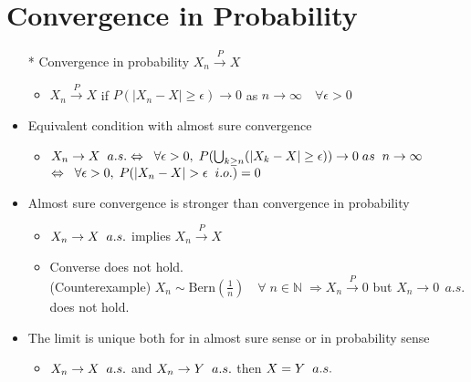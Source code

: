 \documentclass[12pt, A4]{article}
\begin{document}
\section{Convergence in Probability}
\begin{itemize}
	\item[*] Convergence in probability $X_n \xrightarrow{P} X$
	\begin{itemize}
		\item $X_n \xrightarrow{P} X$ if $P(|X_n-X|\geq \epsilon)\rightarrow 0$ as $ n\rightarrow \infty \quad \forall \epsilon>0$
	\end{itemize}
	\item Equivalent condition with almost sure convergence
	\begin{itemize}
		\item $X_n \rightarrow X \hspace{0.2cm} a.s. \Leftrightarrow \hspace{0.2cm} \forall \epsilon>0, \hspace{0.1cm} P(\bigcup_{k\geq n}(|X_k-X|\geq \epsilon))\rightarrow 0 \hspace{0.1cm} as \hspace{0.2cm} n\rightarrow \infty$
		\newline $\Leftrightarrow \hspace{0.2cm} \forall \epsilon>0, \hspace{0.1cm} P(|X_n-X|>\epsilon \hspace{0.2cm} i.o.)=0$
	\end{itemize}
	\item Almost sure convergence is stronger than convergence in probability
	\begin{itemize}
		\item $X_n\rightarrow X \hspace{0.2cm} a.s.$ implies $X_n \xrightarrow{P} X$
		\item Converse does not hold. \\ (Counterexample)  $X_n\sim \text{Bern}(\frac 1n)\quad \forall \; n\in \mathbb{N}\; \Rightarrow X_n \xrightarrow{P} 0$ but $X_n\rightarrow 0 \;\, a.s.$ does not hold.
	\end{itemize}
	\item The limit is unique both for in almost sure sense or in probability sense
	\begin{itemize}
		\item $X_n\rightarrow X \hspace{0.2cm} a.s.$ and $X_n\rightarrow Y \hspace{0.2cm} a.s.$ then $X=Y \hspace{0.2cm} a.s.$

\end{itemize}
\end{itemize}
\end{document}
